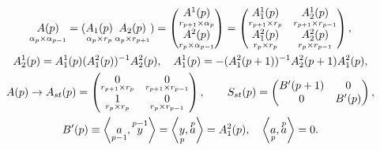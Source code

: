 \begin{gather} 


\down{\alpha_p\times\alpha_{p-1}}{A(p)}= 


(\down{\alpha_p\times r_p}{A_1(p)}\, 


\down{\alpha_p\times r_{p+1}}{A_2(p)})= 


\begin{pmatrix} 


\down{r_{p+1}\times\alpha_p}{A^1(p)} \\ 


\down{r_p\times\alpha_{p-1}}{A^2(p)} 


\end{pmatrix} 


= 


\begin{pmatrix} 


\down{r_{p+1}\times r_p}{A^1_1(p)} &  


\down{r_{p+1}\times r_{p-1}}{A^1_2(p)} \\ 


\down{r_p\times r_p}{A^2_1(p)} & 


\down{r_p\times r_{p-1}}{A^2_2(p)} 


\end{pmatrix} 


,\notag \\ 


A^1_2(p)=A^1_1(p)(A^2_1(p))^{-1}A^2_2(p),\quad 


A^1_1(p)=-(A^2_1(p+1))^{-1}A^2_2(p+1)A^2_1(p),\notag \\ 


A(p)\to A_{st}(p)= 


\begin{pmatrix} 


\down{r_{p+1}\times r_p}{0} & 


\down{r_{p+1}\times r_{p-1}}{0} \\ 


\down{r_p\times r_p}{1} & \down{r_p\times r_{p-1}}{0} 


\end{pmatrix} 


,\qquad S_{st}(p)= 


\begin{pmatrix} 


B'(p+1) & 0 \\ 0 & B'(p) 


\end{pmatrix} 


, \\ 


B'(p)\equiv\left\langle\down{p-1}{a},\up{p-1}{y} \right\rangle= 


\left\langle\down{p}{y},\up{p}{a} \right\rangle 


=A^2_1(p),\quad 


\left\langle\down{p}{a},\up{p}{a} \right\rangle=0.\notag 


\end{gather} 


